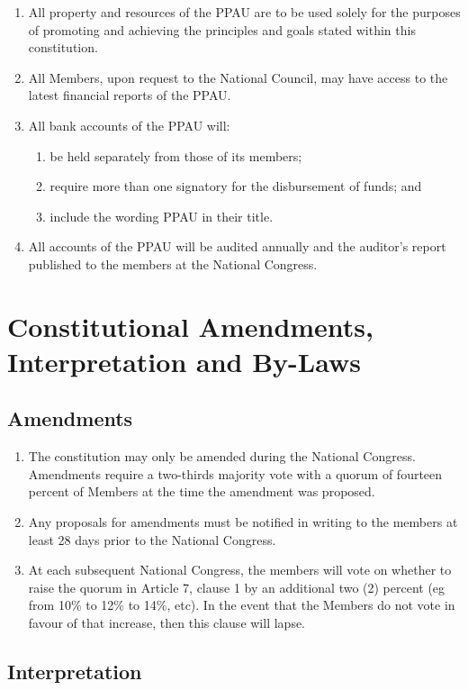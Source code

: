 \documentclass[a4paper,titlepage,8.5pt]{article}
\begin{document}
\begin{enumerate}
\item All property and resources of the PPAU are to be used solely for the purposes of promoting and achieving the principles and goals stated within this constitution.
\item All Members, upon request to the National Council, may have access to the latest financial reports of the PPAU.
\item All bank accounts of the PPAU will:
\begin{enumerate}
\item be held separately from those of its members;
\item require more than one signatory for the disbursement of funds; and 
\item include the wording PPAU in their title.
\end{enumerate}
\item All accounts of the PPAU will be audited annually and the auditor’s report published to the members at the National Congress.
\end{enumerate}

\section{Constitutional Amendments, Interpretation and By-Laws}

\subsection{Amendments}

\begin{enumerate}
\item The constitution may only be amended during the National Congress. Amendments require a two-thirds majority vote with a quorum of fourteen percent of Members at the time the amendment was proposed.
\item Any proposals for amendments must be notified in writing to the members at least 28 days prior to the National Congress.
\item At each subsequent National Congress, the members will vote on whether to raise the quorum in Article 7, clause 1 by an additional two (2) percent (eg from 10\% to 12\% to 14\%, etc). In the event that the Members do not vote in favour of that increase, then this clause will lapse.
\end{enumerate}

\subsection{Interpretation}
\end{document}
